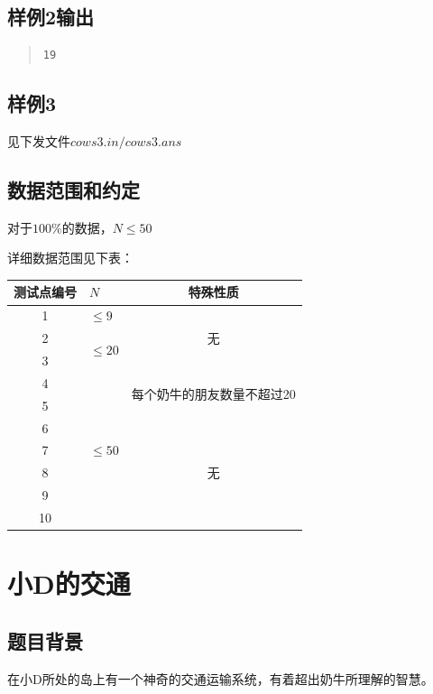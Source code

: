 \documentclass[12pt, a4paper]{article}
\begin{document}
\subsection{样例2输出}
\begin{quote}
\begin{verbatim}
19
\end{verbatim}
\end{quote}
\subsection{样例3}
	
见下发文件$cows3.in/cows3.ans$

\subsection{数据范围和约定}

对于$100\%$的数据，$N\leq 50$

详细数据范围见下表：

\begin{tabular}{|c|p{40pt}<{\centering}|c|}
	\hline
	测试点编号 & $N$ & 特殊性质\\
	\hline
	1 & $\leq 9$ & \multirow{3}{*}{无} \\
	\cline{1-2}
	2 & \multirow{2}{*}{$\leq 20$}& \\
	\cline{1-1}
	3 & & \\
	\cline{1-3}
	4 &\multirow{7}{*}{$\leq 50$} & \multirow{2}{*}{每个奶牛的朋友数量不超过20} \\
	\cline{1-1}
	5 & & \\
	\cline{1-1}\cline{3-3}
    6 & & \multirow{5}{*}{无} \\
    \cline{1-1}
    7 & &\\
    \cline{1-1}
    8 & &\\
    \cline{1-1}
    9 & & \\
    \cline{1-1}
	10 & & \\
    \hline
\end{tabular}

\newpage
\section{小D的交通}

\subsection{题目背景}

	在小D所处的岛上有一个神奇的交通运输系统，有着超出奶牛所理解的智慧。
\end{document}
